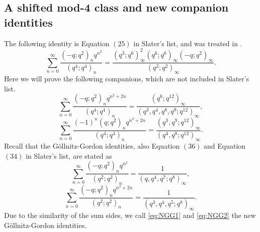 \documentclass[11pt]{amsart}
\theoremstyle{definition}
\theoremstyle{remark}
\numberwithin{equation}{section}
\begin{document}
\subsection{A shifted mod-4 class and new companion identities}\label{sec:ngg}
The following identity is Equation $(25)$ in Slater's list, and was treated in \cite{DGLSIPI}.
\begin{equation}\label{eq:NGG1}
\sum_{n=0}^{\infty}\frac{(-q;q^2)_{n}q^{n^2}}{(q^4;q^4)_{n}}
=\dfrac{(q^3;q^6)^2_\infty(q^6;q^6)_\infty(-q;q^2)_\infty}{(q^2;q^2)_\infty}.
\end{equation}
Here we will prove the following companions, which are not included in Slater's list.
\begin{equation}\label{eq:NGG2}
\sum_{n=0}^{\infty}\frac{(-q;q^2)_{n}q^{n^2+2n}}{(q^4;q^4)_{n}}
=\frac{(q^6;q^{12})_{\infty}}{(q^3,q^4,q^8,q^9;q^{12})_{\infty}}, 
\end{equation}
\begin{equation}
\sum_{n=0}^{\infty}\frac{(-1)^n(q;q^2)_nq^{n^2+2n}}{(q^4;q^4)_n}
=\frac{(q^3,q^9;q^{12})_{\infty}}{(q^4,q^8;q^{12})_{\infty}}.
\end{equation}
Recall that the G\"ollnitz-Gordon identities, also Equation $(36)$ and Equation $(34)$ in Slater's list, are stated as
\begin{equation}\label{eq:GG1}
\sum_{n=0}^{\infty}\frac{(-q;q^2)_nq^{n^{2}}}{(q^2;q^2)_n}=\frac{1}{(q,q^4,q^7;q^8)_{\infty}},
\end{equation}
\begin{equation}
\sum_{n=0}^{\infty}\frac{(-q;q^2)_nq^{n^{2}+2n}}{(q^2;q^2)_n}=\frac{1}{(q^3,q^4,q^5;q^8)_{\infty}}.
\end{equation}
Due to the similarity of the sum sides, we call \eqref{eq:NGG1} and \eqref{eq:NGG2} the new G\"ollnitz-Gordon identities.
\end{document}
